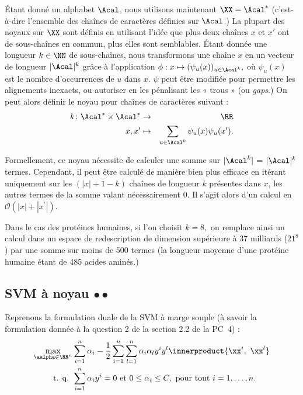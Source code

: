 Étant donné un alphabet $\Acal$, nous utilisons maintenant $\XX = \Acal^*$
(c'est-à-dire l'ensemble des chaînes de caractères définies sur $\Acal$.) La
plupart des noyaux sur $\XX$ sont définis en utilisant l'idée que plus deux
chaînes $x$ et $x'$ ont de sous-chaînes en commun, plus elles sont semblables.
Étant donnée une longueur $k \in \NN$ de sous-chaînes, nous transformons une
chaîne $x$ en un vecteur de longueur $|\Acal|^k$ grâce à l'application
$\phi: x \mapsto (\psi_u(x))_{u \in \Acal^k},$ où $\psi_u(x)$ est le nombre
d'occurrences de $u$ dans $x$. $\psi$ peut être modifiée pour permettre les
alignements inexacts, ou autoriser en les pénalisant les « trous » (ou {\it
  gaps}.)
On peut alors définir le noyau pour chaînes de caractères suivant :
\begin{eqnarray*}
  k \colon \Acal^* \times \Acal^* & \to & \RR \\
  x, x^\prime & \mapsto & \sum_{u \in \Acal^k} \psi_u(x) \psi_u(x^\prime).
\end{eqnarray*}

Formellement, ce noyau nécessite de calculer une somme sur $|\Acal^k|$ =
$|\Acal|^k$ termes. Cependant, il peut être calculé de manière bien plus
efficace en itérant uniquement sur les $(|x|+1-k)$ chaînes de longueur $k$
présentes dans $x$, les autres termes de la somme valant nécessairement 0. Il
s'agit alors d'un calcul en $\mathcal{O}(|x| +|x^\prime|)$.

Dans le cas des protéines humaines, si l'on choisit $k=8,$ on remplace
ainsi un calcul dans un espace de redescription de dimension supérieure à
37 milliards ($21^8$) par une somme sur moins de 500 termes (la longueur
moyenne d'une protéine humaine étant de 485 acides aminés.)

\subsection{SVM à noyau $\bullet \bullet$}
\label{sec:kernel_svm}
Reprenons la formulation duale de la SVM à marge souple (à savoir la
formulation donnée à la question 2 de la section 2.2 de la PC~4) :
\begin{align}
  \label{eq:soft-margin-dual-pb}
  \max_{\aalpha \in \RR^n} & 
                           \sum_{i=1}^n  \alpha_i- 
                           \frac{1}{2} \sum_{i=1}^n \sum_{l=1}^n \alpha_i \alpha_l y^i y^l \innerproduct{\xx^i,~\xx^l} \\
  \nonumber \text{ t. q. } & \sum_{i=1}^n \alpha_i y^i = 0 \text{ et }  0 \leq \alpha_i
                             \leq C, \text{ pour tout } i=1, \dots, n.
\end{align}

